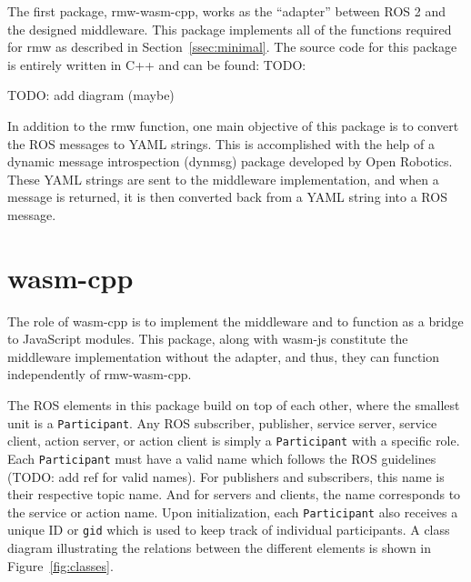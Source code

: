         The first package, \textsf{rmw-wasm-cpp}, works as the ``adapter'' between \ac{ROS} 2 and the designed middleware. This package implements all of the functions required for \textsf{rmw} as described in Section~\ref{ssec:minimal}. The source code for this package is entirely written in C++ and can be found: TODO: 

        TODO: add diagram (maybe)

        In addition to the \textsf{rmw} function, one main objective of this package is to convert the \ac{ROS} messages to \ac{YAML} strings. This is accomplished with the help of a dynamic message introspection (\textsf{dynmsg}) package developed by Open Robotics. These \ac{YAML} strings are sent to the middleware implementation, and when a message is returned, it is then converted back from a \ac{YAML} string into a ROS message. 

    \section{wasm-cpp}

        The role of \textsf{wasm-cpp} is to implement the middleware and to function as a bridge to JavaScript modules. This package, along with \textsf{wasm-js} constitute the middleware implementation without the adapter, and thus, they can function independently of \textsf{rmw-wasm-cpp}. 

        The \ac{ROS} elements in this package build on top of each other, where the smallest unit is a \texttt{Participant}. Any \ac{ROS} subscriber, publisher, service server, service client, action server, or action client is simply a \texttt{Participant} with a specific role. Each \texttt{Participant} must have a valid name which follows the \ac{ROS} guidelines (TODO: add ref for valid names). For publishers and subscribers, this name is their respective topic name. And for servers and clients, the name corresponds to the service or action name.  Upon initialization, each \texttt{Participant} also receives a unique ID or \texttt{gid} which is used to keep track of individual participants. A class diagram illustrating the relations between the different elements is shown in Figure~\ref{fig:classes}.

